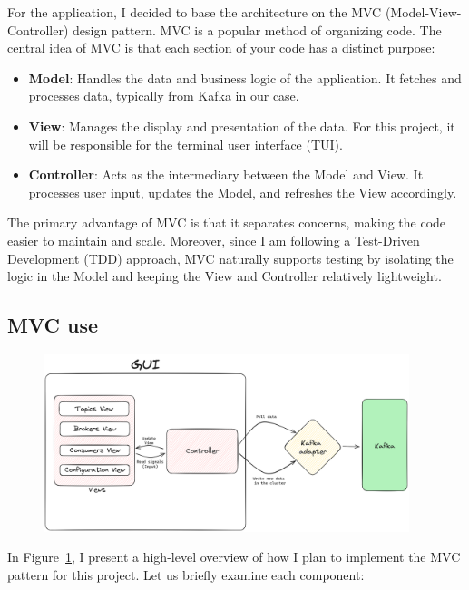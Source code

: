 \documentclass[10pt , a4paper]{report}
\begin{document}
For the application, I decided to base the architecture on the MVC (Model-View-Controller) design pattern. MVC is a popular method of organizing code. The central idea of MVC is that each section of your code has a distinct purpose:
\begin{itemize}
    \item \textbf{Model}: Handles the data and business logic of the application. It fetches and processes data, typically from Kafka in our case.
    \item \textbf{View}: Manages the display and presentation of the data. For this project, it will be responsible for the terminal user interface (TUI).
    \item \textbf{Controller}: Acts as the intermediary between the Model and View. It processes user input, updates the Model, and refreshes the View accordingly.
\end{itemize}

The primary advantage of MVC is that it separates concerns, making the code easier to maintain and scale. Moreover, since I am following a Test-Driven Development (TDD) approach, MVC naturally supports testing by isolating the logic in the Model and keeping the View and Controller relatively lightweight.

\subsection{MVC use}

\begin{figure}[htbp]
  \begin{center}
    \includegraphics[width=0.95\textwidth]{imgs/InitialArchitecture.png}
  \end{center}
  \caption{}\label{fig:mvc_diagram}
\end{figure}

In Figure~\ref{fig:mvc_diagram}, I present a high-level overview of how I plan to implement the MVC pattern for this project. Let us briefly examine each component:
\end{document}
